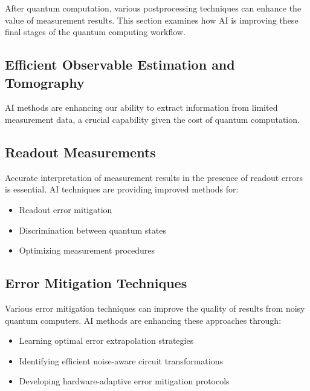 After quantum computation, various postprocessing techniques can enhance the value of measurement results. This section examines how AI is improving these final stages of the quantum computing workflow.

\subsection{Efficient Observable Estimation and Tomography}
AI methods are enhancing our ability to extract information from limited measurement data, a crucial capability given the cost of quantum computation.

\subsection{Readout Measurements}
Accurate interpretation of measurement results in the presence of readout errors is essential. AI techniques are providing improved methods for:

\begin{itemize}
    \item Readout error mitigation
    \item Discrimination between quantum states
    \item Optimizing measurement procedures
\end{itemize}

\subsection{Error Mitigation Techniques}
Various error mitigation techniques can improve the quality of results from noisy quantum computers. AI methods are enhancing these approaches through:

\begin{itemize}
    \item Learning optimal error extrapolation strategies
    \item Identifying efficient noise-aware circuit transformations
    \item Developing hardware-adaptive error mitigation protocols
\end{itemize} 